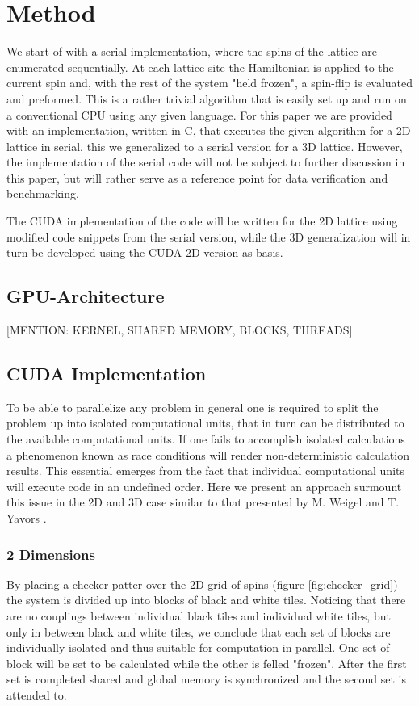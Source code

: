 \documentclass[paper=a4, fontsize=11pt]{scrartcl} %
\numberwithin{equation}{section} %
\numberwithin{figure}{section} %
\numberwithin{table}{section} %
\begin{document}
\section{Method}
\label{sec:method}
We start of with a serial implementation, where the spins of the lattice are enumerated sequentially. At each lattice site the Hamiltonian is applied to the current spin and, with the rest of the system "held frozen", a spin-flip is evaluated and preformed. This is a rather trivial algorithm that is easily set up and run on a conventional CPU using any given language. For this paper we are provided with an implementation, written in C, that executes the given algorithm for a 2D lattice in serial, this we generalized to a serial version for a 3D lattice. However, the implementation of the serial code will not be subject to further discussion in this paper, but will rather serve as a reference point for data verification and benchmarking.

The CUDA implementation of the code will be written for the 2D lattice using modified code snippets from the serial version, while the 3D generalization will in turn be developed using the CUDA 2D version as basis.

\subsection{GPU-Architecture}

[MENTION: KERNEL, SHARED MEMORY, BLOCKS, THREADS]


\subsection{CUDA Implementation}
To be able to parallelize any problem in general one is required to split the problem up into isolated computational units, that in turn can be distributed to the available computational units. If one fails to accomplish isolated calculations a phenomenon known as race conditions will render non-deterministic calculation results. This essential emerges from the fact that individual computational units will execute code in an undefined order. Here we present an approach surmount this issue in the 2D and 3D case similar to that presented by M. Weigel and T. Yavors \cite{gpu_mc_spins}.

\subsubsection{2 Dimensions}
By placing a checker patter over the 2D grid of spins (figure \ref{fig:checker_grid}) the system is divided up into blocks of black and white tiles. Noticing that there are no couplings between individual black tiles and individual white tiles, but only in between black and white tiles, we conclude that each set of blocks are individually isolated and thus suitable for computation in parallel. One set of block will be set to be calculated while the other is felled "frozen". After the first set is completed shared and global memory is synchronized and the second set is attended to.
\end{document}
